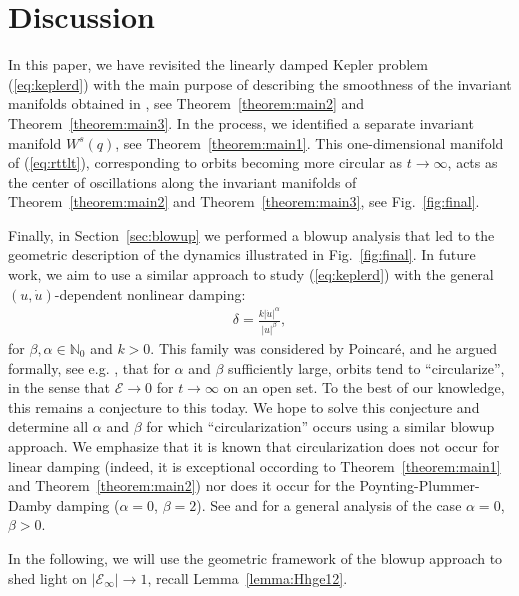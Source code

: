 \documentclass[reqno,12pt]{amsart}
\newcommand{\secref}[1]{Section~\ref{sec:#1}}
\newcommand{\seclab}[1]{\label{sec:#1}}
\renewcommand{\eqref}[1]{(\ref{eq:#1})}
\newcommand{\figref}[1]{Fig.~\ref{fig:#1}}
\newcommand{\lemmaref}[1]{Lemma~\ref{lemma:#1}}
\newcommand{\corref}[1]{Corollary~\ref{cor:#1}}
\newcommand{\thmref}[1]{Theorem~\ref{theorem:#1}}
\numberwithin{equation}{section}
\begin{document}
\section{Discussion}\seclab{disc}
In this paper, we have revisited the linearly damped Kepler problem \eqref{keplerd} with the main purpose of describing the smoothness of the invariant manifolds obtained in \cite{margheri2017a}, see \thmref{main2} and \thmref{main3}. In the process, we identified a separate invariant manifold $W^s(q)$, see \thmref{main1}. This one-dimensional manifold of \eqref{rttlt}, corresponding to orbits becoming more circular as $t\rightarrow \infty$, acts as the center of oscillations along the invariant manifolds of \thmref{main2} and \thmref{main3}, see \figref{final}. %

Finally, in \secref{blowup} we performed a blowup analysis that led to the geometric description of the dynamics illustrated in \figref{final}. In future work, we aim to use a similar approach to study \eqref{keplerd} with the general $(u,\dot u)$-dependent nonlinear damping:
\begin{align*}
\delta = \frac{k \vert \dot u\vert^\alpha}{\vert u\vert^\beta},
\end{align*}
for $\beta,\alpha \in \mathbb N_0$ and $k>0$. This family was considered by Poincar\'e, and he argued formally, see e.g. \cite{margheri2020a}, that for $\alpha$ and $\beta$ sufficiently large, orbits tend to ``circularize'', in the sense that $\mathcal E\rightarrow 0$ for $t\rightarrow \infty$ on an open set. To the best of our knowledge, this remains a conjecture to this today. We hope to solve this conjecture and determine all $\alpha$ and $\beta$ for which ``circularization'' occurs using a similar blowup approach. We emphasize that it is known that circularization does not occur for linear damping (indeed, it is exceptional occording to \thmref{main1} and \thmref{main2}) nor does it occur for the Poynting-Plummer-Damby damping ($\alpha=0$, $\beta=2$). See \cite{diacu1999a} and \cite{margheri2020a} for a general analysis of the case $\alpha=0$, $\beta>0$.

 In the following, we will use the geometric framework of the blowup approach to shed light on $\vert \mathcal E_\infty\vert\rightarrow 1$, recall \lemmaref{Hhge12}.
\end{document}

